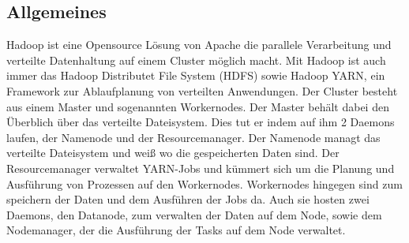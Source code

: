 \documentclass[12pt,oneside,a4paper,parskip]{scrbook}
\begin{document}
\subsection{Allgemeines}
Hadoop ist eine Opensource Lösung von Apache die parallele Verarbeitung und verteilte Datenhaltung auf einem Cluster möglich macht. Mit Hadoop ist auch immer das Hadoop Distributet File System (HDFS) sowie Hadoop YARN, ein Framework zur Ablaufplanung von verteilten Anwendungen. \newline
Der Cluster besteht aus einem Master und sogenannten Workernodes. Der Master behält dabei den Überblich über das verteilte Dateisystem. Dies tut er indem auf ihm 2 Daemons laufen, der Namenode und der Resourcemanager. Der Namenode managt das verteilte Dateisystem und weiß wo die gespeicherten Daten sind. Der Resourcemanager verwaltet YARN-Jobs und kümmert sich um die Planung und Ausführung von Prozessen auf den Workernodes. \newline
Workernodes hingegen sind zum speichern der Daten und dem Ausführen der Jobs da. Auch sie hosten zwei Daemons, den Datanode, zum verwalten der Daten auf dem Node, sowie dem Nodemanager, der die Ausführung der Tasks auf dem Node verwaltet.
\end{document}
